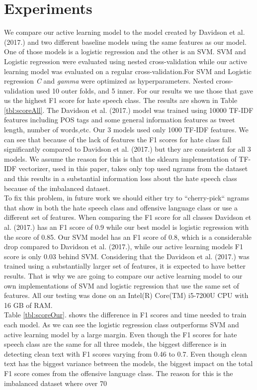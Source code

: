 \documentclass[10pt, a4paper]{article}
\begin{document}
\section{Experiments}
We compare our active learning model to the model created by Davidson et al. (2017.) and two different baseline models using the same features as our model. One of those models is a logistic regression and the other is an SVM. SVM and Logistic regression were evaluated using nested cross-validation while our active learning model was evaluated on a regular cross-validation.For SVM and Logistic regression \textit{C} and \textit{gamma} were optimized as hyperparameters. Nested cross-validation used 10 outer folds, and 5 inner. For our results we use those that gave us the highest F1 score for hate speech class. The results are shown in Table \ref{tbl:scoreAll}. The Davidson et al. (2017.) model was trained using 10000 TF-IDF features including POS tags and some general information features as tweet length, number of words,etc. Our 3 models used only 1000 TF-IDF features. We can see that because of the lack of features the F1 scores for hate class fall significantly compared to Davidson et al. (2017.) but they are consistent for all 3 models. We assume the reason for this is that the sklearn implementation of TF-IDF vectorizer, used in this paper, takes only top used ngrams from the dataset and this results in a substantial information loss about the hate speech class because of the imbalanced dataset.  
\\To fix this problem, in future work we should either try to “cherry-pick“ ngrams that show in both the hate speech class and offensive language class or use a different set of features. When comparing the F1 score for all classes Davidson et al. (2017.) has an F1 score of 0.9 while our best model is logistic regression with the score of 0.85. Our SVM model has an F1 score of 0.8, which is a considerable drop compared to Davidson et al. (2017.), while our active learning models F1 score is only 0.03 behind SVM. Considering that the Davidson et al. (2017.) was trained using a substantially larger set of features, it is expected to have better results. That is why we are going to compare our active learning model to our own implementations of SVM and logistic regression that use the same set of features. All our testing was done on an Intel(R) Core(TM) i5-7200U CPU with 16 GB of RAM. 
\\Table \ref{tbl:scoreOur}. shows the difference in F1 scores and time needed to train each model. As we can see the logistic regression class outperforms SVM and active learning model by a large margin. Even though the F1 scores for hate speech class are the same for all three models, the biggest difference is in detecting clean text with F1 scores varying from 0.46 to 0.7. Even though clean text has the biggest variance between the models, the biggest impact on the total F1 score comes from the offensive language class. The reason for this is the imbalanced dataset where over 70%
\end{document}
